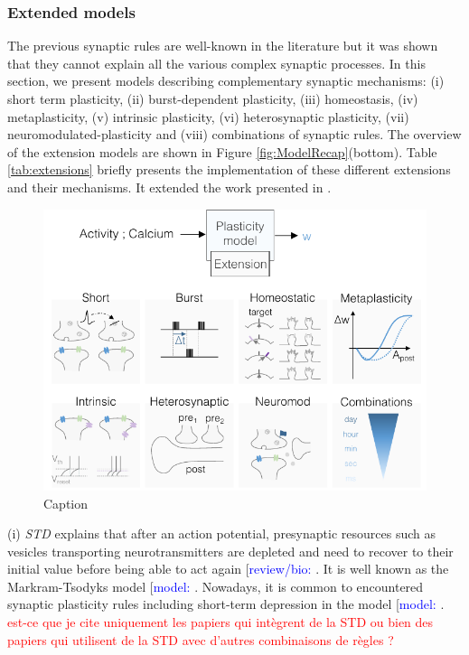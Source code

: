 \subsubsection{Extended models}
The previous synaptic rules are well-known in the literature but it was shown that they cannot explain all the various complex synaptic processes. In this section, we present models describing complementary synaptic mechanisms: (i) short term plasticity, (ii) burst-dependent plasticity, (iii) homeostasis, (iv) metaplasticity, (v) intrinsic plasticity, (vi) heterosynaptic plasticity, (vii) neuromodulated-plasticity and (viii) combinations of synaptic rules. The overview of the extension models are shown in Figure \ref{fig:ModelRecap}(bottom). Table \ref{tab:extensions} briefly presents the implementation of these different extensions and their mechanisms. It extended the work presented in \citep{clopath_long-term_2019}. 

\begin{figure}[h!]
    \centering
    \includegraphics{latex/fig/Methods/ModelRecap_Extension.pdf}
    \caption{Caption}
    \label{fig:my_label}
\end{figure}






(i) \textit{\acrfull{STD}} explains that after an action potential, presynaptic resources such as vesicles transporting neurotransmitters are depleted and need to recover to their initial value before being able to act again [\textcolor{blue}{review/bio:} \cite{zucker_short-term_2002}. It is well known as the Markram-Tsodyks model [\textcolor{blue}{model:} \cite{markram_regulation_1997}. Nowadays, it is common to encountered synaptic plasticity rules including short-term depression in the model [\textcolor{blue}{model:} \cite{zenke_diverse_2015, chen_heterosynaptic_2013, olcese_sleep_2010, shah_biophysical_2006, cai_effect_2007, deperrois_short-term_2020, carvalho_novel_2011, hansel_short-term_2013}. \textcolor{red}{est-ce que je cite uniquement les papiers qui intègrent de la STD ou bien des papiers qui utilisent de la STD avec d'autres combinaisons de règles ? }\\

